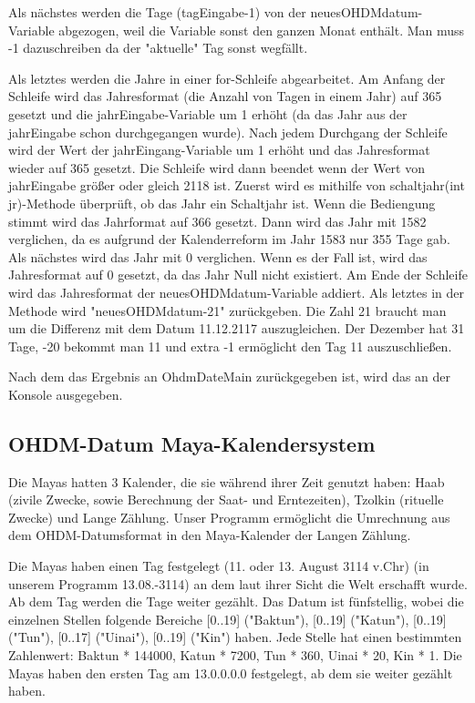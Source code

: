 \documentclass[]{article}
\begin{document}
Als nächstes werden die Tage (tagEingabe-1) von der neuesOHDMdatum-Variable abgezogen, weil die Variable sonst den ganzen Monat enthält. Man muss -1 dazuschreiben da der "aktuelle" Tag sonst wegfällt.

Als letztes werden die Jahre in einer for-Schleife abgearbeitet. Am Anfang der Schleife wird das Jahresformat (die Anzahl von Tagen in einem Jahr) auf 365 gesetzt und die jahrEingabe-Variable um 1 erhöht (da das Jahr aus der jahrEingabe schon durchgegangen wurde). Nach jedem Durchgang der Schleife wird der Wert der jahrEingang-Variable um 1 erhöht und das Jahresformat wieder auf 365 gesetzt. Die Schleife wird dann beendet wenn der Wert von jahrEingabe größer oder gleich 2118 ist. Zuerst wird es mithilfe von schaltjahr(int jr)-Methode überprüft, ob das Jahr ein Schaltjahr ist. Wenn die Bediengung stimmt wird das Jahrformat auf 366 gesetzt. Dann wird das Jahr mit 1582 verglichen, da es aufgrund der Kalenderreform im Jahr 1583 nur 355 Tage gab. Als nächstes wird das Jahr mit 0 verglichen. Wenn es der Fall ist, wird das Jahresformat auf 0 gesetzt, da das Jahr Null  nicht existiert. Am Ende der Schleife wird das Jahresformat der neuesOHDMdatum-Variable addiert. Als letztes in der Methode wird "neuesOHDMdatum-21" zurückgeben. Die Zahl 21 braucht man um die Differenz mit dem Datum 11.12.2117 auszugleichen. Der Dezember hat 31 Tage, -20 bekommt man 11 und extra -1 ermöglicht den Tag 11 auszuschließen.

Nach dem das Ergebnis an OhdmDateMain zurückgegeben ist, wird das an der Konsole ausgegeben.


\subsection{OHDM-Datum \textrightarrow Maya-Kalendersystem}
Die Mayas hatten 3 Kalender, die sie während ihrer Zeit genutzt haben: Haab (zivile Zwecke,  sowie Berechnung der Saat- und Erntezeiten), Tzolkin (rituelle Zwecke) und Lange Zählung. Unser Programm ermöglicht die Umrechnung aus dem OHDM-Datumsformat in den Maya-Kalender der Langen Zählung.

Die Mayas haben einen Tag festgelegt (11. oder 13. August 3114 v.Chr) (in unserem Programm 13.08.-3114) an dem laut ihrer Sicht die Welt erschafft wurde. Ab dem Tag werden die Tage weiter gezählt. Das Datum ist fünfstellig, wobei die einzelnen Stellen folgende Bereiche [0..19] ("Baktun"), [0..19] ("Katun"), [0..19] ("Tun"), [0..17] ("Uinai"), [0..19] ("Kin") haben. Jede Stelle hat einen bestimmten Zahlenwert: Baktun * 144000, Katun * 7200, Tun * 360, Uinai * 20, Kin * 1.  Die Mayas haben den ersten Tag am 13.0.0.0.0 festgelegt, ab dem sie weiter gezählt haben. 
\end{document}
